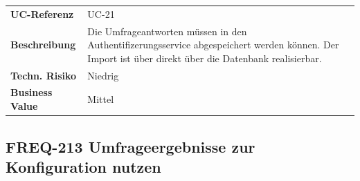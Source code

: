\begin{longtable}[c]{@{}ll@{}}
\toprule
\begin{minipage}[t]{0.20\columnwidth}\raggedright\strut
\textbf{UC-Referenz}
\strut\end{minipage} &
\begin{minipage}[t]{0.74\columnwidth}\raggedright\strut
UC-21
\strut\end{minipage}\tabularnewline
\begin{minipage}[t]{0.20\columnwidth}\raggedright\strut
\textbf{Beschreibung}
\strut\end{minipage} &
\begin{minipage}[t]{0.74\columnwidth}\raggedright\strut
Die Umfrageantworten müssen in den Authentifizerungsservice
abgespeichert werden können. Der Import ist über direkt über die
Datenbank realisierbar.
\strut\end{minipage}\tabularnewline
\begin{minipage}[t]{0.20\columnwidth}\raggedright\strut
\textbf{Techn. Risiko}
\strut\end{minipage} &
\begin{minipage}[t]{0.74\columnwidth}\raggedright\strut
Niedrig
\strut\end{minipage}\tabularnewline
\begin{minipage}[t]{0.20\columnwidth}\raggedright\strut
\textbf{Business Value}
\strut\end{minipage} &
\begin{minipage}[t]{0.74\columnwidth}\raggedright\strut
Mittel
\strut\end{minipage}\tabularnewline
\bottomrule
\end{longtable}

\subsection{FREQ-213 Umfrageergebnisse zur Konfiguration
nutzen}\label{freq-213-umfrageergebnisse-zur-konfiguration-nutzen}

